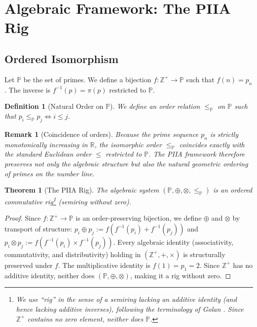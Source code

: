 \documentclass[11pt, a4paper]{article}
\newtheorem{theorem}{Theorem}
\newtheorem{definition}{Definition}
\newtheorem{remark}{Remark}
\begin{document}
\section{Algebraic Framework: The PIIA Rig}

\subsection{Ordered Isomorphism}
Let $\mathbb{P}$ be the set of primes. We define a bijection $f: \mathbb{Z}^+ \to \mathbb{P}$ such that $f(n) = p_n$. The inverse is $f^{-1}(p) = \pi(p)$ restricted to $\mathbb{P}$.

\begin{definition}[Natural Order on $\mathbb{P}$]
We define an order relation $\le_{\mathbb{P}}$ on $\mathbb{P}$ such that $p_i \le_{\mathbb{P}} p_j \iff i \le j$.
\end{definition}

\begin{remark}[Coincidence of orders]
Because the prime sequence $p_n$ is strictly monotonically increasing in $\mathbb{R}$, the isomorphic order $\le_{\mathbb{P}}$ coincides exactly with the standard Euclidean order $\le$ restricted to $\mathbb{P}$. The PIIA framework therefore preserves not only the algebraic structure but also the natural geometric ordering of primes on the number line.
\end{remark}

\begin{theorem}[The PIIA Rig]\label{thm:rig}
The algebraic system $(\mathbb{P}, \oplus, \otimes, \le_{\mathbb{P}})$ is an ordered commutative rig\footnote{We use ``rig'' in the sense of a semiring lacking an additive identity (and hence lacking additive inverses), following the terminology of Golan \cite{golan}. Since $\mathbb{Z}^+$ contains no zero element, neither does $\mathbb{P}$.} (semiring without zero).
\end{theorem}
\begin{proof}
Since $f: \mathbb{Z}^+ \to \mathbb{P}$ is an order-preserving bijection, we define $\oplus$ and $\otimes$ by transport of structure: $p_i \oplus p_j := f(f^{-1}(p_i) + f^{-1}(p_j))$ and $p_i \otimes p_j := f(f^{-1}(p_i) \times f^{-1}(p_j))$. Every algebraic identity (associativity, commutativity, and distributivity) holding in $(\mathbb{Z}^+, +, \times)$ is structurally preserved under $f$. The multiplicative identity is $f(1) = p_1 = 2$. Since $\mathbb{Z}^+$ has no additive identity, neither does $(\mathbb{P}, \oplus, \otimes)$, making it a rig without zero.
\end{proof}
\end{document}
